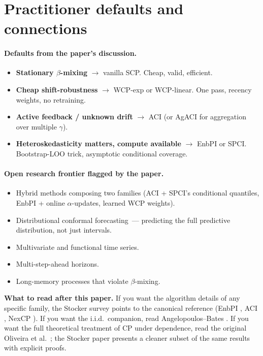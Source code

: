\documentclass[letterpaper,11pt,leqno]{article}
\begin{document}
\section{Practitioner defaults and connections}\label{s:practice}

\paragraph{Defaults from the paper's discussion.}
\begin{itemize}
\item \textbf{Stationary $\beta$-mixing} $\to$ vanilla SCP. Cheap, valid, efficient.
\item \textbf{Cheap shift-robustness} $\to$ WCP-exp or WCP-linear. One pass, recency weights, no retraining.
\item \textbf{Active feedback / unknown drift} $\to$ ACI (or AgACI for aggregation over multiple $\gamma$).
\item \textbf{Heteroskedasticity matters, compute available} $\to$ EnbPI or SPCI. Bootstrap-LOO trick, asymptotic conditional coverage.
\end{itemize}

\paragraph{Open research frontier flagged by the paper.}
\begin{itemize}
\item Hybrid methods composing two families (ACI + SPCI's conditional quantiles, EnbPI + online $\alpha$-updates, learned WCP weights).
\item Distributional conformal forecasting~--- predicting the full predictive distribution, not just intervals.
\item Multivariate and functional time series.
\item Multi-step-ahead horizons.
\item Long-memory processes that violate $\beta$-mixing.
\end{itemize}

\begin{explain}
\textbf{What to read after this paper.} If you want the algorithm details of any specific family, the Stocker survey points to the canonical reference (EnbPI \cite{xu2023enbpi}, ACI \cite{gibbs2021aci, zaffran2022aci}, NexCP \cite{barber2023beyond}). If you want the i.i.d.~companion, read Angelopoulos--Bates \cite{angelopoulos2022gentle}. If you want the full theoretical treatment of CP under dependence, read the original Oliveira et al.\ \cite{oliveira2024split}; the Stocker paper presents a cleaner subset of the same results with explicit proofs.
\end{explain}
\end{document}
